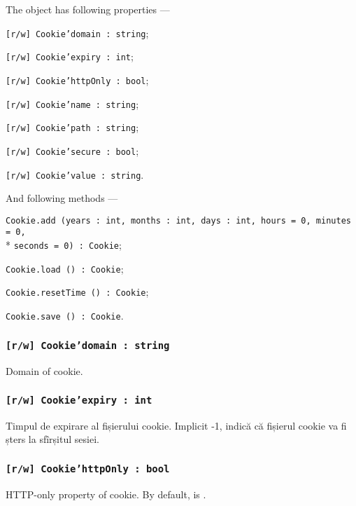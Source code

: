 The object \cookie{} has following properties —
\begin{icItems}
	\item \texttt{[r/w] Cookie'domain : string};
	\item \texttt{[r/w] Cookie'expiry : int};
	\item \texttt{[r/w] Cookie'httpOnly : bool};
	\item \texttt{[r/w] Cookie'name : string};
	\item \texttt{[r/w] Cookie'path : string};
	\item \texttt{[r/w] Cookie'secure : bool};
	\item \texttt{[r/w] Cookie'value : string}.
\end{icItems}

And following methods —
\begin{icItems}
	\item \texttt{Cookie.add (years : int, months : int, days : int, hours = 0, minutes = 0,}\\* \texttt{seconds = 0) : Cookie};
	\item \texttt{Cookie.load () : Cookie};
	\item \texttt{Cookie.resetTime () : Cookie};
	\item \texttt{Cookie.save () : Cookie}.
\end{icItems}

\subsubsection{\texttt{[r/w] Cookie'domain : string}}

Domain of cookie.

\subsubsection{\texttt{[r/w] Cookie'expiry : int}}

Timpul de expirare al fișierului cookie. Implicit -1, indică că fișierul cookie va fi șters la sfîrșitul sesiei.

\subsubsection{\texttt{[r/w] Cookie'httpOnly : bool}}

HTTP-only property of cookie. By default, is \false.

